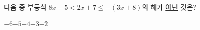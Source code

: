 다음 중 부등식 $8x-5<2x+7\le -(3x+8)$의 해가 \underline{아닌} 것은?
\begin{choices32}{$-6$}{$-5$}{$-4$}{$-3$}{$-2$}\end{choices32}
